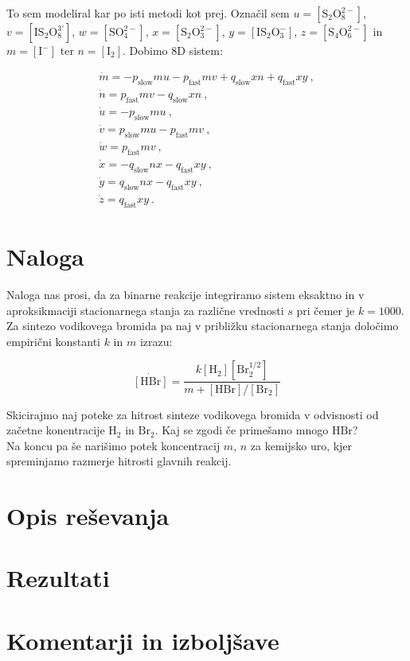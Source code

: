 \documentclass[a4paper]{article}
\begin{document}
To sem modeliral kar po isti metodi kot prej. Označil sem $u = [\mathrm{S}_2\mathrm{O}_8^{2-}]$,
$v = [\mathrm{I}\mathrm{S}_2\mathrm{O}_8^{3'}]$, $w = [\mathrm{S}\mathrm{O}_4^{2-}]$,
$x = [\mathrm{S}_2\mathrm{O}_3^{2-}]$, $y = [\mathrm{I}\mathrm{S}_2\mathrm{O}_3^{-}]$, $z = [\mathrm{S}_4\mathrm{O}_6^{2-}]$
in $m = [\mathrm{I}^-]$ ter $n = [\mathrm{I}_2]$. Dobimo 8D sistem:

\begin{gather}
    \dot{m} = - p_\mathrm{slow}mu - p_\mathrm{fast}mv + q_\mathrm{slow}xn + q_\mathrm{fast}xy\>,\\
    \dot{n} = p_\mathrm{fast}mv - q_\mathrm{slow}xn\>,\\
    \dot{u} = - p_\mathrm{slow}mu\>,\\
    \dot{v} = p_\mathrm{slow}mu - p_\mathrm{fast}mv\>,\\
    \dot{w} = p_\mathrm{fast}mv\>,\\
    \dot{x} = - q_\mathrm{slow}nx - q_\mathrm{fast}xy\>,\\
    \dot{y} = q_\mathrm{slow}nx - q_\mathrm{fast}xy\>,\\
    \dot{z} = q_\mathrm{fast}xy\>.
\end{gather}


\section{Naloga}
Naloga nas prosi, da za binarne reakcije integriramo sistem eksaktno in
v aproksikmaciji stacionarnega stanja za različne vrednosti $s$ pri čemer je 
$k=1000$. Za sintezo vodikovega bromida pa naj v približku stacionarnega stanja
določimo empirični konstanti $k$ in $m$ izrazu:

\begin{equation}
    \dot{[\mathrm{HBr}]} = \frac{k[\mathrm{H}_2][\mathrm{Br}_2^{1/2}]}{m + [\mathrm{HBr}]/[\mathrm{Br}_2]}
\end{equation}

Skicirajmo naj poteke za hitrost sinteze vodikovega bromida v odvisnosti od začetne konentracije 
$\mathrm{H}_2$ in $\mathrm{Br}_2$. Kaj se zgodi če primešamo mnogo $\mathrm{HBr}$?\\

Na koncu pa še narišimo potek koncentracij $m$, $n$ za kemijsko uro, kjer spreminjamo razmerje
hitrosti glavnih reakcij.\\

\section{Opis reševanja}

\section{Rezultati}


\section{Komentarji in izboljšave}

\newpage


\end{document}
